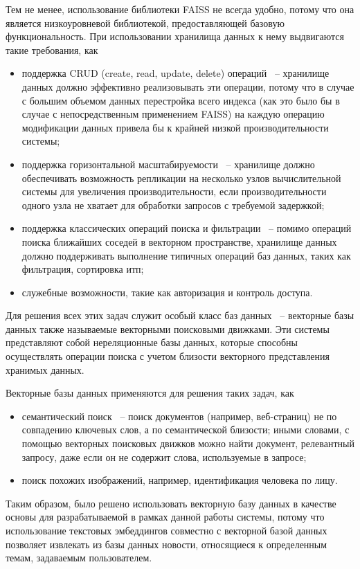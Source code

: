 Тем не менее, использование библиотеки FAISS не всегда удобно, потому что она является низкоуровневой библиотекой, предоставляющей базовую функциональность. При использовании хранилища данных к нему выдвигаются такие требования, как
\begin{itemize}
    \item поддержка CRUD (create, read, update, delete) операций ~-- хранилище данных должно эффективно реализовывать эти операции, потому что в случае с большим объемом данных перестройка всего индекса (как это было бы в случае с непосредственным применением FAISS) на каждую операцию модификации данных привела бы к крайней низкой производительности системы;
    \item поддержка горизонтальной масштабируемости ~-- хранилище должно обеспечивать возможность репликации на несколько узлов вычислительной системы для увеличения производительности, если производительности одного узла не хватает для обработки запросов с требуемой задержкой;
    \item поддержка классических операций поиска и фильтрации ~-- помимо операций поиска ближайших соседей в векторном пространстве, хранилище данных должно поддерживать выполнение типичных операций баз данных, таких как фильтрация, сортировка итп;
    \item служебные возможности, такие как авторизация и контроль доступа.
\end{itemize}

Для решения всех этих задач служит особый класс баз данных ~-- векторные базы данных также называемые векторными поисковыми движками. Эти системы представляют собой нереляционные базы данных, которые способны осуществлять операции поиска с учетом близости векторного представления хранимых данных.

Векторные базы данных применяются для решения таких задач, как
\begin{itemize}
    \item семантический поиск ~-- поиск документов (например, веб-страниц) не по совпадению ключевых слов, а по семантической близости; иными словами, с помощью векторных поисковых движков можно найти документ, релевантный запросу, даже если он не содержит слова, используемые в запросе;
    \item поиск похожих изображений, например, идентификация человека по лицу.
\end{itemize}

Таким образом, было решено использовать векторную базу данных в качестве основы для разрабатываемой в рамках данной работы системы, потому что использование текстовых эмбеддингов совместно с векторной базой данных позволяет извлекать из базы данных новости, относящиеся к определенным темам, задаваемым пользователем.

